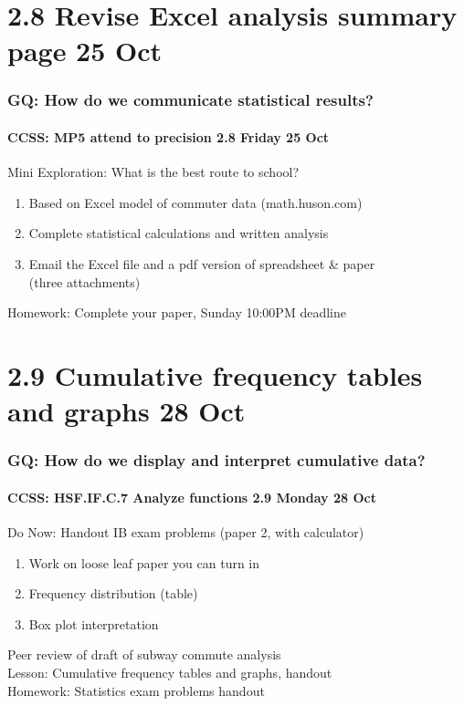 \documentclass{beamer}
\begin{document}
  \section{2.8 Revise Excel analysis summary page 25 Oct}
  \frame
  {
    \frametitle{GQ: How do we communicate statistical results?}
    \framesubtitle{CCSS: MP5 attend to precision \hfill \alert{2.8 Friday 25 Oct}}

    \begin{block}{Mini Exploration: What is the best route to school?}
      \begin{enumerate}
        \item Based on Excel model of commuter data (math.huson.com)
        \item Complete statistical calculations and written analysis
        \item Email the Excel file and a pdf version of spreadsheet \& paper\\
        (three attachments)
    \end{enumerate}
    \end{block}
    Homework: Complete your paper, Sunday 10:00PM deadline
  }

  \section{2.9 Cumulative frequency tables and graphs 28 Oct}
  \frame
  {
    \frametitle{GQ: How do we display and interpret cumulative data?}
    \framesubtitle{CCSS: HSF.IF.C.7 Analyze functions \hfill \alert{2.9 Monday 28 Oct}}

    \begin{block}{Do Now: Handout IB exam problems (paper 2, with calculator)}
    \begin{enumerate}
        \item Work on loose leaf paper you can turn in
        \item Frequency distribution (table)
        \item Box plot interpretation
    \end{enumerate}
    \end{block}
    Peer review of draft of subway commute analysis \\
    Lesson: Cumulative frequency tables and graphs, handout\\ \smallskip
    Homework: Statistics exam problems handout
  }
\end{document}
